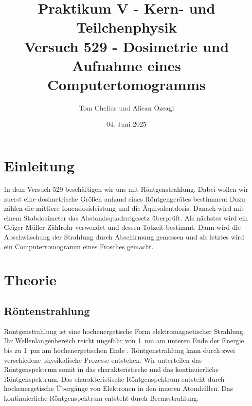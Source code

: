 \documentclass{article}
\title{Praktikum V - Kern- und Teilchenphysik\\Versuch 529 - Dosimetrie und Aufnahme eines Computertomogramms}
\author{Tom Chelius und Alican Özcagi}
\date{04. Juni 2025}
\begin{document}
\maketitle
\newpage
\tableofcontents

\newpage

\section{Einleitung}

In dem Versuch 529 beschäftigen wir uns mit Röntgenstrahlung. 
Dabei wollen wir zuerst eine dosimetrische Größen anhand eines Röntgengerätes bestimmen: Dazu zählen die mittlere Ionendosisleistung und die Äquivalentdosis.
Danach wird mit einem Stabdosimeter das Abstandsquadratgesetz überprüft.
Als nächstes wird ein Geiger-Müller-Zählrohr verwendet und dessen Totzeit bestimmt.
Dann wird die Abschwäschung der Strahlung durch Abschirmung gemessen und als letztes wird ein Computertomogramm eines Frosches gemacht.
\section{Theorie}

\subsection{Röntenstrahlung}

Röntgenstrahlung ist eine hochenergetische Form elektromagnetischer Strahlung. 
Ihr Wellenlängenbereich reicht ungefähr von \SI{1}{\nano\meter} am unteren Ende der Energie bis zu \SI{1}{\pico\meter} am hochenergetischen Ende \cite{RoentgenBereich}.
Röntgenstrahlung kann durch zwei verschiedene physikalische Prozesse entstehen. 
Wir unterteilen das Röntgenspektrum somit in das charakteristische und das kontinuierliche Röntgenspektrum.
Das charakteristische Röntgenspektrum entsteht durch hochenergetische Übergänge von Elektronen in den inneren Atomhüllen.
Das kontinuierliche Röntgenspektrum entsteht durch Bremsstrahlung.
\end{document}
